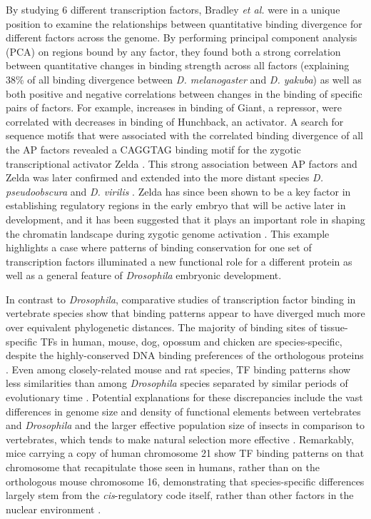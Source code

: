 By studying 6 different transcription factors, Bradley \emph{et al.} were in a unique position to examine the relationships between quantitative binding divergence for different factors across the genome. By performing principal component analysis (PCA) on regions bound by any factor, they found both a strong correlation between quantitative changes in binding strength across all factors (explaining 38\% of all binding divergence between \emph{D. melanogaster} and \emph{D. yakuba}) as well as both positive and negative correlations between changes in the binding of specific pairs of factors. For example, increases in binding of Giant, a repressor, were correlated with decreases in binding of Hunchback, an activator. A search for sequence motifs that were associated with the correlated binding divergence of all the AP factors revealed a CAGGTAG binding motif for the zygotic transcriptional activator Zelda \citep{bradley_binding_2010}. This strong association between AP factors and Zelda was later confirmed and extended into the more distant species \emph{D. pseudoobscura} and \emph{D. virilis} \citep{paris_extensive_2013}. Zelda has since been shown to be a key factor in establishing regulatory regions in the early embryo that will be active later in development, and it has been suggested that it plays an important role in shaping the chromatin landscape during zygotic genome activation \citep{harrison_zelda_2011,satija_tagteam_2012}. This example highlights a case where patterns of binding conservation for one set of transcription factors illuminated a new functional role for a different protein as well as a general feature of \emph{Drosophila} embryonic development.

In contrast to \emph{Drosophila}, comparative studies of transcription factor binding in vertebrate species show that binding patterns appear to have diverged much more over equivalent phylogenetic distances. The majority of binding sites of tissue-specific TFs in human, mouse, dog, opossum and chicken are species-specific, despite the highly-conserved DNA binding preferences of the orthologous proteins \citep{odom_tissue-specific_2007,schmidt_five-vertebrate_2010}. Even among closely-related mouse and rat species, TF binding patterns show less similarities than among \emph{Drosophila} species separated by similar periods of evolutionary time \citep{stefflova_cooperativity_2013}. Potential explanations for these discrepancies include the vast differences in genome size and density of functional elements between vertebrates and \emph{Drosophila} and the larger effective population size of insects in comparison to vertebrates, which tends to make natural selection more effective \citep{villar_evolution_2014}. Remarkably, mice carrying a copy of human chromosome 21 show TF binding patterns on that chromosome that recapitulate those seen in humans, rather than on the orthologous mouse chromosome 16, demonstrating that species-specific differences largely stem from the \emph{cis}-regulatory code itself, rather than other factors in the nuclear environment \citep{wilson_species-specific_2008}.

